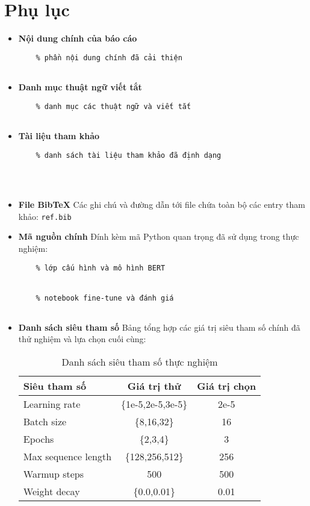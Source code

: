\section{Phụ lục}
\begin{itemize}
    \item \textbf{Nội dung chính của báo cáo}  
    \begin{verbatim}
    % phần nội dung chính đã cải thiện
    
    \end{verbatim}
    
    \item \textbf{Danh mục thuật ngữ viết tắt}  
    \begin{verbatim}
    % danh mục các thuật ngữ và viết tắt
    
    \end{verbatim}
    
    \item \textbf{Tài liệu tham khảo}  
    \begin{verbatim}
    % danh sách tài liệu tham khảo đã định dạng
    
    
    
    \end{verbatim}
    
    \item \textbf{File BibTeX}  
    Các ghi chú và đường dẫn tới file chứa toàn bộ các entry tham khảo:  
    \verb|ref.bib|
    
    \item \textbf{Mã nguồn chính}  
    Đính kèm mã Python quan trọng đã sử dụng trong thực nghiệm:  
    \begin{verbatim}
    % lớp cấu hình và mô hình BERT
    
    
    % notebook fine‐tune và đánh giá
    
    \end{verbatim}
    
    \item \textbf{Danh sách siêu tham số}  
    Bảng tổng hợp các giá trị siêu tham số chính đã thử nghiệm và lựa chọn cuối cùng:
    \begin{table}[h]
      \centering
      \begin{tabular}{lcc}
        \hline
        Siêu tham số         & Giá trị thử & Giá trị chọn \\
        \hline
        Learning rate         & \{1e-5,2e-5,3e-5\} & 2e-5 \\
        Batch size            & \{8,16,32\}       & 16   \\
        Epochs                & \{2,3,4\}         & 3    \\
        Max sequence length   & \{128,256,512\}   & 256  \\
        Warmup steps          & 500               & 500  \\
        Weight decay          & \{0.0,0.01\}      & 0.01 \\
        \hline
      \end{tabular}
      \caption{Danh sách siêu tham số thực nghiệm}
    \end{table}
    

\end{itemize}
